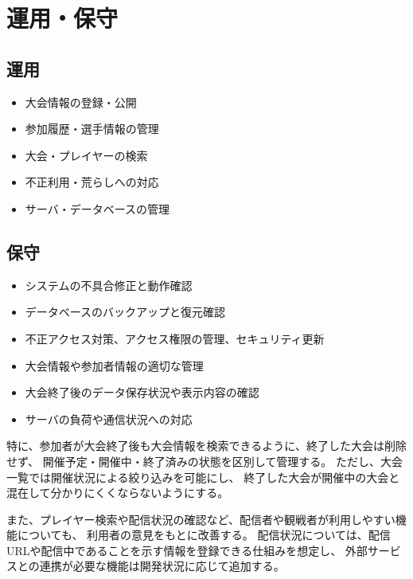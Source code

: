 \section{運用・保守}

\subsection{運用}
\begin{itemize}
    \item 大会情報の登録・公開
    \item 参加履歴・選手情報の管理
    \item 大会・プレイヤーの検索
    \item 不正利用・荒らしへの対応
    \item サーバ・データベースの管理
\end{itemize}

\subsection{保守}
\begin{itemize}
    \item システムの不具合修正と動作確認
    \item データベースのバックアップと復元確認
    \item 不正アクセス対策、アクセス権限の管理、セキュリティ更新
    \item 大会情報や参加者情報の適切な管理
    \item 大会終了後のデータ保存状況や表示内容の確認
    \item サーバの負荷や通信状況への対応
\end{itemize}

特に、参加者が大会終了後も大会情報を検索できるように、終了した大会は削除せず、
開催予定・開催中・終了済みの状態を区別して管理する。
ただし、大会一覧では開催状況による絞り込みを可能にし、
終了した大会が開催中の大会と混在して分かりにくくならないようにする。

また、プレイヤー検索や配信状況の確認など、配信者や観戦者が利用しやすい機能についても、
利用者の意見をもとに改善する。
配信状況については、配信URLや配信中であることを示す情報を登録できる仕組みを想定し、
外部サービスとの連携が必要な機能は開発状況に応じて追加する。